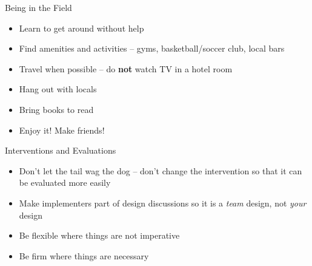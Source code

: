 \documentclass[
  ignorenonframetext,
]{beamer}
\providecommand{\tightlist}{%
  \setlength{\itemsep}{0pt}\setlength{\parskip}{0pt}}
\begin{document}
\begin{frame}{Being in the Field}
\protect\hypertarget{being-in-the-field-3}{}
\begin{itemize}
\tightlist
\item
  Learn to get around without help
\item
  Find amenities and activities -- gyms, basketball/soccer club, local
  bars
\item
  Travel when possible -- do \textbf{not} watch TV in a hotel room
\item
  Hang out with locals
\item
  Bring books to read
\end{itemize}

\medskip

\begin{itemize}
\tightlist
\item
  Enjoy it! Make friends!
\end{itemize}
\end{frame}

\begin{frame}{Interventions and Evaluations}
\protect\hypertarget{interventions-and-evaluations}{}
\begin{itemize}
\tightlist
\item
  Don't let the tail wag the dog -- don't change the intervention so
  that it can be evaluated more easily
\item
  Make implementers part of design discussions so it is a \emph{team}
  design, not \emph{your} design
\item
  Be flexible where things are not imperative
\item
  Be firm where things are necessary
\end{itemize}
\end{frame}
\end{document}
